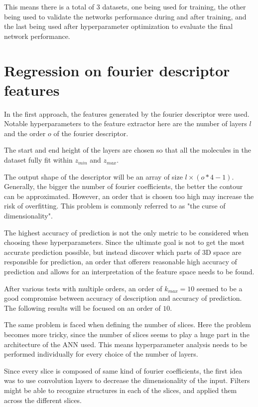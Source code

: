 This means there is a total of 3 datasets, one being used for training, the other being used to validate the networks
performance during and after training, and the last being used after hyperparameter optimization to evaluate the final network
performance.

\section{Regression on fourier descriptor features}
\label{sec:Evaluation:fourier}

In the first approach, the features generated by the fourier descriptor were used.
Notable hyperparameters to the feature extractor here are the number of layers $l$ and the order $o$ of the fourier descriptor.

The start and end height of the layers are chosen so that all the molecules in the dataset fully fit within $z_{min}$ and $z_{max}$.

The output shape of the descriptor will be an array of size $l \times (o * 4 - 1)$.
Generally, the bigger the number of fourier coefficients, the better the contour can be approximated.
However, an order that is chosen too high may increase the risk of overfitting.
This problem is commonly referred to as "the curse of dimensionality". %

The highest accuracy of prediction is not the only metric to be considered when choosing these hyperparameters.
Since the ultimate goal is not to get the most accurate prediction possible, but instead discover which parts of 3D space 
are responsible for prediction, an order that offerers reasonable high accuracy of prediction and 
allows for an interpretation of the feature space needs to be found.

After various tests with multiple orders, an order of $k_{max} = 10$ seemed to be a good compromise between accuracy of description and accuracy of prediction.
The following results will be focused on an order of $10$.

The same problem is faced when defining the number of slices.
Here the problem becomes more tricky, since the number of slices seems to play a huge part in the architecture of the ANN used.
This means hyperparameter analysis needs to be performed individually for every choice of the number of layers.

Since every slice is composed of same kind of fourier coefficients, the first idea was to use convolution layers to decrease the dimensionality of the input.
Filters might be able to recognize structures in each of the slices, and applied them across the different slices.

